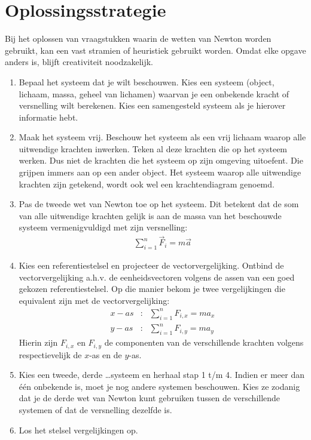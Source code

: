 \documentclass{ximera}
\begin{document}
	\author{Bart Lambregs}
    \xmsource





	\section{Oplossingsstrategie}

	Bij het oplossen van vraagstukken waarin de wetten van Newton worden gebruikt, kan een vast stramien of heuristiek gebruikt worden. Omdat elke opgave anders is, blijft creativiteit noodzakelijk.
	\begin{enumerate}
	\item Bepaal het systeem dat je wilt beschouwen. Kies een systeem (object, lichaam, massa, geheel van lichamen) waarvan je een onbekende kracht of versnelling wilt berekenen. Kies een samengesteld systeem als je hierover informatie hebt.
	\item Maak het systeem vrij. Beschouw het systeem als een vrij lichaam waarop alle uitwendige krachten inwerken. Teken al deze krachten die op het systeem werken. Dus niet de krachten die het systeem op zijn omgeving uitoefent. Die grijpen immers aan op een ander object. Het systeem waarop alle uitwendige krachten zijn getekend, wordt ook wel een krachtendiagram genoemd.
	\item Pas de tweede wet van Newton toe op het systeem. Dit betekent dat de som van alle uitwendige krachten gelijk is aan de massa van het beschouwde systeem vermenigvuldigd met zijn versnelling:
	\begin{eqnarray*}
	\sum_{i=1}^n\vec{F}_i=m\vec{a}
	\end{eqnarray*}
	\item Kies een referentiestelsel en projecteer de vectorvergelijking. Ontbind de vectorvergelijking a.h.v. de eenheidsvectoren volgens de assen van een goed gekozen referentiestelsel. Op die manier bekom je
	twee vergelijkingen die equivalent zijn met de vectorvergelijking:
	\begin{eqnarray*}
	x-as&:&\sum_{i=1}^nF_{i,x}=ma_x\\
	y-as&:&\sum_{i=1}^nF_{i,y}=ma_y
	\end{eqnarray*}
	Hierin zijn $F_{i,x}$ en $F_{i,y}$ de componenten van de verschillende krachten volgens respectievelijk de $x$-as en de $y$-as.
	\item Kies een tweede, derde \ldots systeem en herhaal stap 1 t/m 4. Indien er meer dan \'e\'en onbekende is, moet je nog andere systemen beschouwen. Kies ze zodanig dat je de derde wet van Newton kunt gebruiken tussen de verschillende systemen of dat de versnelling dezelfde is.
	\item Los het stelsel vergelijkingen op.
	\end{enumerate}
	
\end{document}
